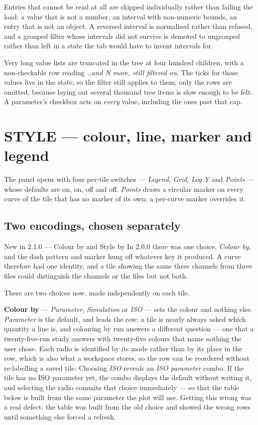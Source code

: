 \documentclass[11pt,a4paper,oneside]{report}
\begin{document}
Entries that cannot be read at all are skipped individually rather than failing
the load: a value that is not a number, an interval with non-numeric bounds, an
entry that is not an object. A reversed interval is normalised rather than
refused, and a grouped filter whose intervals did not survive is demoted to
ungrouped rather than left in a state the tab would have to invent intervals for.

Very long value lists are truncated in the tree at four hundred children, with a
non-checkable row reading \emph{\ldots and N more, still filtered on}. The ticks
for those values live in the state, so the filter still applies to them; only the
rows are omitted, because laying out several thousand tree items is slow enough
to be felt. A parameter's checkbox acts on \emph{every} value, including the ones
past that cap.

\section{STYLE --- colour, line, marker and legend}
\label{sec:style}

The panel opens with four per-tile switches --- \emph{Legend}, \emph{Grid},
\emph{Log Y} and \emph{Points} --- whose defaults are on, on, off and off.
\emph{Points} draws a circular marker on every curve of the tile that has no
marker of its own; a per-curve marker overrides it.

\subsection{Two encodings, chosen separately}

\begin{aoenew}{New in 2.1.0 --- Colour by and Style by}
In 2.0.0 there was one choice, \emph{Colour by}, and the dash pattern and marker
hung off whatever key it produced. A curve therefore had one identity, and a tile
showing the same three channels from three files could distinguish the channels
or the files but not both.

There are two choices now, made independently on each tile.
\end{aoenew}

\textbf{Colour by} --- \emph{Parameter}, \emph{Simulation} or \emph{ISO} --- sets
the colour and nothing else. \emph{Parameter} is the default, and leads the
row: a tile is nearly always asked which quantity a line is, and colouring by
run answers a different question --- one that a twenty-five-run study answers
with twenty-five colours that name nothing the user chose. Each radio is
identified by its mode rather than by its place in the row, which is also what
a workspace stores, so the row can be reordered without re-labelling a saved
tile. Choosing \emph{ISO} reveals an \emph{ISO parameter}
combo. If the tile has no ISO parameter yet, the combo displays the default
without writing it, and selecting the radio commits that choice immediately ---
so that the table below is built from the same parameter the plot will use.
Getting this wrong was a real defect: the table was built from the old choice and
showed the wrong rows until something else forced a refresh.
\end{document}
